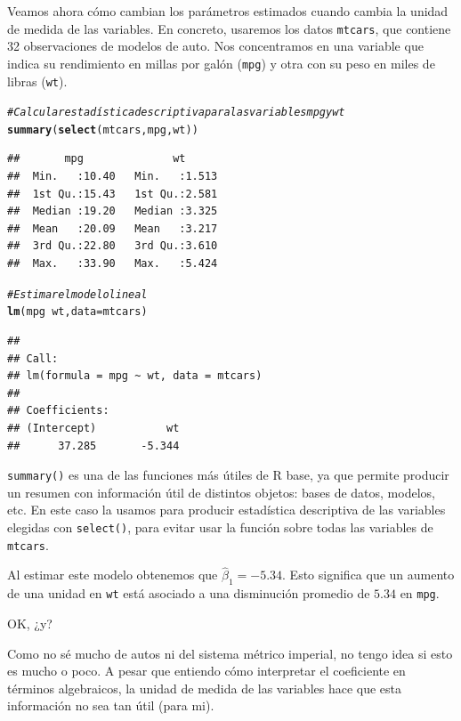 \documentclass[12pt]{report}\usepackage[]{graphicx}\usepackage[]{color}
\makeatletter
\newcommand{\hlcom}[1]{\textcolor[rgb]{0.678,0.584,0.686}{\textit{#1}}}%
\newcommand{\hlopt}[1]{\textcolor[rgb]{0,0,0}{#1}}%
\newcommand{\hlstd}[1]{\textcolor[rgb]{0.345,0.345,0.345}{#1}}%
\newcommand{\hlkwc}[1]{\textcolor[rgb]{0.333,0.667,0.333}{#1}}%
\newcommand{\hlkwd}[1]{\textcolor[rgb]{0.737,0.353,0.396}{\textbf{#1}}}%
\newenvironment{kframe}{%
 \def\at@end@of@kframe{}%
 \ifinner\ifhmode%
  \def\at@end@of@kframe{\end{minipage}}%
  \begin{minipage}{\columnwidth}%
 \fi\fi%
 \def\FrameCommand##1{\hskip\@totalleftmargin \hskip-\fboxsep
 \colorbox{shadecolor}{##1}\hskip-\fboxsep
     \hskip-\linewidth \hskip-\@totalleftmargin \hskip\columnwidth}%
 \MakeFramed {\advance\hsize-\width
   \@totalleftmargin\z@ \linewidth\hsize
   \@setminipage}}%
 {\par\unskip\endMakeFramed%
 \at@end@of@kframe}
\newenvironment{knitrout}{}{} %
\makeatother
\begin{document}
Veamos ahora cómo cambian los parámetros estimados cuando cambia la unidad de medida de las variables.
En concreto, usaremos los datos \verb|mtcars|, que contiene 32 observaciones de modelos de auto.
Nos concentramos en una variable que indica su rendimiento en millas por galón (\verb|mpg|) y otra con su peso en miles de libras (\verb|wt|).

\begin{knitrout}
\color{fgcolor}\begin{kframe}
\begin{alltt}
\hlcom{# Calcular estadística descriptiva para las variables mpg y wt}
\hlkwd{summary}\hlstd{(}\hlkwd{select}\hlstd{(mtcars, mpg, wt))}
\end{alltt}
\begin{verbatim}
##       mpg              wt       
##  Min.   :10.40   Min.   :1.513  
##  1st Qu.:15.43   1st Qu.:2.581  
##  Median :19.20   Median :3.325  
##  Mean   :20.09   Mean   :3.217  
##  3rd Qu.:22.80   3rd Qu.:3.610  
##  Max.   :33.90   Max.   :5.424
\end{verbatim}
\begin{alltt}
\hlcom{# Estimar el modelo lineal }
\hlkwd{lm}\hlstd{(mpg} \hlopt{~} \hlstd{wt,} \hlkwc{data} \hlstd{= mtcars)}
\end{alltt}
\begin{verbatim}
## 
## Call:
## lm(formula = mpg ~ wt, data = mtcars)
## 
## Coefficients:
## (Intercept)           wt  
##      37.285       -5.344
\end{verbatim}
\end{kframe}
\end{knitrout}




\begin{Rbox}
\verb|summary()| es una de las funciones más útiles de R base, ya que permite producir un resumen con información útil de distintos objetos: bases de datos, modelos, etc. En este caso la usamos para producir estadística descriptiva de las variables elegidas con \verb|select()|, para evitar usar la función sobre todas las variables de \verb|mtcars|.
\end{Rbox}

Al estimar este modelo obtenemos que $\hat\beta_1 = -5.34$. Esto significa que un aumento de una unidad en \verb|wt| está asociado a una disminución promedio de $5.34$ en \verb|mpg|.

OK, ¿y?

Como no sé mucho de autos ni del sistema métrico imperial, no tengo idea si esto es mucho o poco.
A pesar que entiendo cómo interpretar el coeficiente en términos algebraicos, la unidad de medida de las variables hace que esta información no sea tan útil (para mi).
\end{document}

